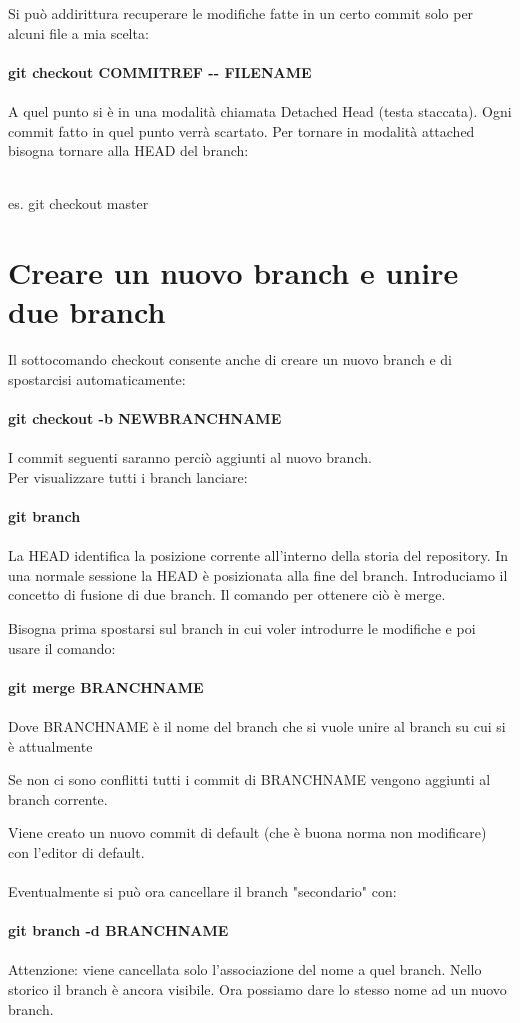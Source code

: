 \documentclass[a4paper,12pt]{report}
\begin{document}
Si può addirittura recuperare le modifiche fatte in un certo commit solo per alcuni file a mia scelta:
\\\\
\textbf{git checkout COMMITREF -{}- FILENAME}
\\\\
A quel punto si è in una modalità chiamata Detached Head (testa staccata). Ogni commit fatto in quel punto verrà scartato. Per tornare in modalità attached bisogna tornare alla HEAD del branch:
\\\\
\centerline{es. git checkout master}

\chapter{Creare un nuovo branch e unire due branch}
Il sottocomando checkout consente anche di creare un nuovo branch e di spostarcisi automaticamente:
\\\\
\textbf{git checkout -b NEWBRANCHNAME}
\\\\
I commit seguenti saranno perciò aggiunti al nuovo branch.
\\
Per visualizzare tutti i branch lanciare:
\\\\
\textbf{git branch}
\\\\
La HEAD identifica la posizione corrente all'interno della storia del repository. In una normale sessione la HEAD è posizionata alla fine del branch.
Introduciamo il concetto di fusione di due branch. Il comando per ottenere ciò è merge.

Bisogna prima spostarsi sul branch in cui voler introdurre le modifiche e poi usare il comando:
\\\\
\textbf{git merge BRANCHNAME}
\\\\
Dove BRANCHNAME è il nome del branch che si vuole unire al branch su cui si è attualmente

Se non ci sono conflitti tutti i commit di BRANCHNAME vengono aggiunti al branch corrente.

Viene creato un nuovo commit di default (che è buona norma non modificare) con l'editor di default.
\\\\
Eventualmente si può ora cancellare il branch "secondario" con:
\\\\
\textbf{git branch -d BRANCHNAME}
\\\\
Attenzione: viene cancellata solo l'associazione del nome a quel branch. Nello storico il branch è ancora visibile. Ora possiamo dare lo stesso nome ad un nuovo branch.
\end{document}
